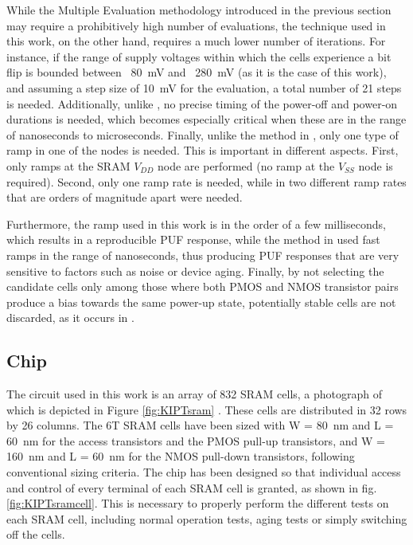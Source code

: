 While the Multiple Evaluation methodology introduced in the previous section may require a prohibitively high number of evaluations, the technique used in this work, on the other hand, requires a much lower number of iterations. For instance, if the range of supply voltages within which the cells experience a bit flip is bounded between ~\SI{80}{mV} and ~\SI{280}{mV} (as it is the case of this work), and assuming a step size of \SI{10}{mV} for the evaluation, a total number of 21 steps is needed. Additionally, unlike \cite{Liu2017}, no precise timing of the power-off and power-on durations is needed, which becomes especially critical when these are in the range of nanoseconds to microseconds. Finally, unlike the method in \cite{Wang2018}, only one type of ramp in one of the nodes is needed. This is important in different aspects. First, only ramps at the SRAM $V_{DD}$ node are performed (no ramp at the $V_{SS}$ node is required). Second, only one ramp rate is needed, while in \cite{Wang2018} two different ramp rates that are orders of magnitude apart were needed.

Furthermore, the ramp used in this work is in the order of a few milliseconds, which results in a reproducible PUF response, while the method in \cite{Wang2018} used fast ramps in the range of nanoseconds, thus producing PUF responses that are very sensitive to factors such as noise or device aging. Finally, by not selecting the candidate cells only among those where both PMOS and NMOS transistor pairs produce a bias towards the same power-up state, potentially stable cells are not discarded, as it occurs in \cite{Wang2018}.



\subsection{Chip}
\label{sec:chip}
The circuit used in this work is an array of 832 SRAM cells, a photograph of which is depicted in Figure \ref{fig:KIPTsram} \cite{Saraza-Canflanca2018}. These cells are distributed in 32 rows by 26 columns. The 6T SRAM cells have been sized with W = \SI{80}{nm} and L = \SI{60}{nm} for the access transistors and the PMOS pull-up transistors, and W = \SI{160}{nm} and L = \SI{60}{nm} for the NMOS pull-down transistors, following conventional sizing criteria. The chip has been designed so that individual access and control of every terminal of each SRAM cell is granted, as shown in fig. \ref{fig:KIPTsramcell}. This is necessary to properly perform the different tests on each SRAM cell, including normal operation tests, aging tests or simply switching off the cells. 

